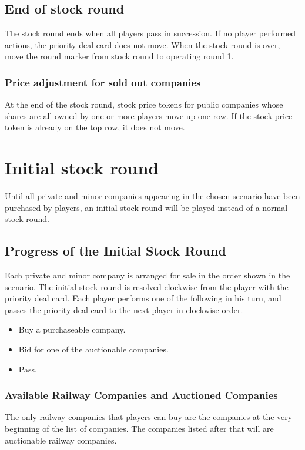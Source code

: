 \documentclass{article}
\begin{document}
\begin{CJK}{UTF8}{min}
\begin{multicols}{2}
\subsection{End of stock round} \label{sr-end-of-sr}
The stock round ends when all players pass in succession. If no
player performed actions, the priority deal card does not move. When
the stock round is over, move the round marker from stock round to
operating round 1.

\subsubsection{Price adjustment for sold out companies}
\label{sr-sold-out}
At the end of the stock round, stock price tokens for public companies
whose shares are all owned by one or more players move up one
row. If the stock price token is already on the top row, it does not move.


\section{Initial stock round}\label{isr}

Until all private and minor companies appearing in the chosen scenario
have been purchased by players, an initial stock round will be played
instead of a normal stock round.

\subsection{Progress of the Initial Stock Round}
Each private and minor company is arranged for sale in the order shown in the
scenario. The initial stock round is resolved clockwise from the
player with the priority deal card. Each player performs one
of the following in his turn, and passes the priority deal
card to the next player in clockwise order.

\begin{itemize}
\item Buy a purchaseable company.
\item Bid for one of the auctionable companies.
\item Pass.
\end{itemize}

\subsubsection{Available Railway Companies and Auctioned Companies}
The only railway companies that players can buy are the companies at
the very beginning of the list of companies. The companies listed
after that will are auctionable railway companies.


\end{multicols}
\end{CJK}
\end{document}
